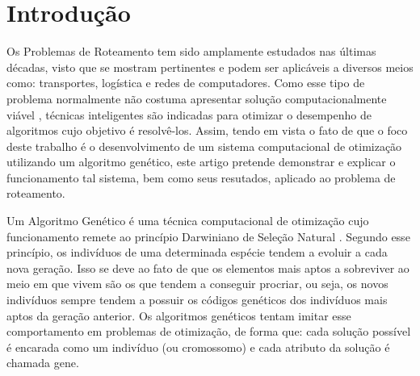 \section{Introdução}


Os Problemas de Roteamento tem sido amplamente estudados nas últimas décadas, visto que se mostram pertinentes e podem ser aplicáveis a diversos meios como: transportes, logística e redes de computadores. Como esse tipo de problema normalmente não costuma apresentar solução computacionalmente viável \cite{paulo2011agprv}, técnicas inteligentes são indicadas para otimizar o desempenho de algoritmos cujo objetivo é resolvê-los. Assim, tendo em vista o fato de que o foco deste trabalho é o desenvolvimento de um sistema computacional de otimização utilizando um algoritmo genético, este artigo pretende demonstrar e explicar o funcionamento tal sistema, bem como seus resutados, aplicado ao problema de roteamento.
	
Um Algoritmo Genético é uma técnica computacional de otimização cujo funcionamento remete ao princípio Darwiniano de Seleção Natural \cite{marco1999agpa}. Segundo esse princípio, os indivíduos de uma determinada espécie tendem a evoluir a cada nova geração. Isso se deve ao fato de que os elementos mais aptos a sobreviver ao meio em que vivem são os que tendem a conseguir procriar, ou seja, os novos indivíduos sempre tendem a possuir os códigos genéticos dos indivíduos mais aptos da geração anterior. Os algoritmos genéticos tentam imitar esse comportamento em problemas de otimização, de forma que: cada solução possível é encarada como um indivíduo (ou cromossomo) e cada atributo da solução é chamada gene.

